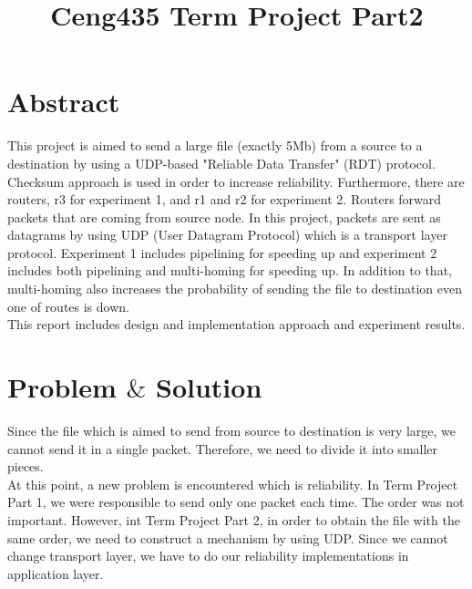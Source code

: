 \documentclass[conference]{IEEEtran}
\begin{document}
\title{Ceng435 Term Project Part2\\
}

\author{
\and
{}
}

\maketitle

\section{Abstract}
This project is aimed to send a large file (exactly 5Mb) from a source to a destination by using a UDP-based "Reliable Data Transfer" (RDT) protocol. Checksum approach is used in order to increase reliability. Furthermore, there are routers, r3 for experiment 1, and r1 and r2 for experiment 2. Routers forward packets that are coming from source node. In this project, packets are sent as datagrams by using UDP (User Datagram Protocol) which is a transport layer protocol. Experiment 1 includes pipelining for speeding up and experiment 2 includes both pipelining and multi-homing for speeding up. In addition to that, multi-homing also increases the probability of sending the file to destination even one of routes is down. \\

This report includes design and implementation approach and experiment results.
\section{Problem $\&$ Solution}
Since the file which is aimed to send from source to destination is very large, we cannot send it in a single packet. Therefore, we need to divide it into smaller pieces. \\

At this point, a new problem is encountered which is reliability. In Term Project Part 1, we were responsible to send only one packet each time. The order was not important. However, int Term Project Part 2, in order to obtain the file with the same order, we need to construct a mechanism by using UDP. Since we cannot change transport layer, we have to do our reliability implementations in application layer.
\end{document}
